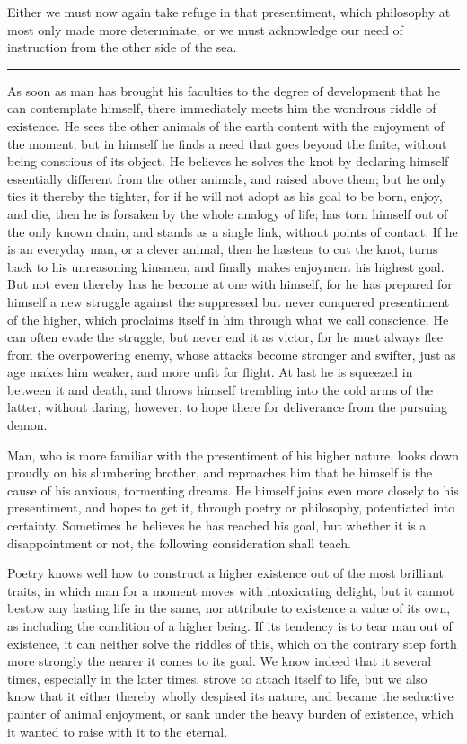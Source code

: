 \documentclass[12pt,a4paper,openany]{book}
\newcommand{\opage}[1]{\marginnote{\footnotesize\textit{[#1]}}}
\newcommand{\sectionrule}{\par\begin{center}\rule{4em}{0.4pt}\end{center}}
\begin{document}
Either we must now again take refuge in that presentiment, which philosophy at most
only made more determinate, or we must acknowledge our need of instruction from the
other side of the sea.

\sectionrule

As soon as man has brought his faculties to the degree of development that he can
contemplate himself, there immediately meets him the wondrous riddle of existence.
He sees the other animals of the earth content with the enjoyment of the moment;
but in himself he finds a need that goes beyond the finite, without being conscious
of its object. He believes he solves the knot by declaring himself essentially
different from the other animals, and raised above them; but he only ties it
thereby the tighter, for if he will not adopt as his goal to be born, enjoy, and
die, then he is forsaken by the whole analogy of life; has torn himself out of the
only known chain, and stands as a single link, without points of contact. If he is
an everyday man, or a clever animal, then he hastens to cut the knot, turns back to
his unreasoning kinsmen, and finally makes enjoyment his highest goal. But not even
thereby has he become at one with
\setcounter{footnote}{0}%
\opage{56}himself, for he has prepared for himself a new struggle against the suppressed
but never conquered presentiment of the higher, which proclaims itself in him
through what we call conscience. He can often evade the struggle, but never end it
as victor, for he must always flee from the overpowering enemy, whose attacks become
stronger and swifter, just as age makes him weaker, and more unfit for flight. At
last he is squeezed in between it and death, and throws himself trembling into the
cold arms of the latter, without daring, however, to hope there for deliverance from
the pursuing demon.

Man, who is more familiar with the presentiment of his higher nature, looks down
proudly on his slumbering brother, and reproaches him that he himself is the cause
of his anxious, tormenting dreams. He himself joins even more closely to his
presentiment, and hopes to get it, through poetry or philosophy, potentiated into
certainty. Sometimes he believes he has reached his goal, but whether it is a
disappointment or not, the following consideration shall teach.

Poetry knows well how to construct a higher existence out of the most brilliant
traits, in which man for a moment moves with intoxicating delight, but it cannot
bestow any lasting life in the same, nor attribute to existence a value of its own,
as including the condition of a higher being. If its tendency is to tear man out of
existence, it can neither solve the riddles of this, which on the contrary step
forth more strongly the nearer it comes to its goal. We know indeed that it several
times, especially in the later times, strove to attach itself to life, but we also
know that it either thereby wholly despised its nature, and became the seductive
painter of animal enjoyment, or sank under the heavy burden of existence, which it
wanted to raise with it to the eternal.
\end{document}

